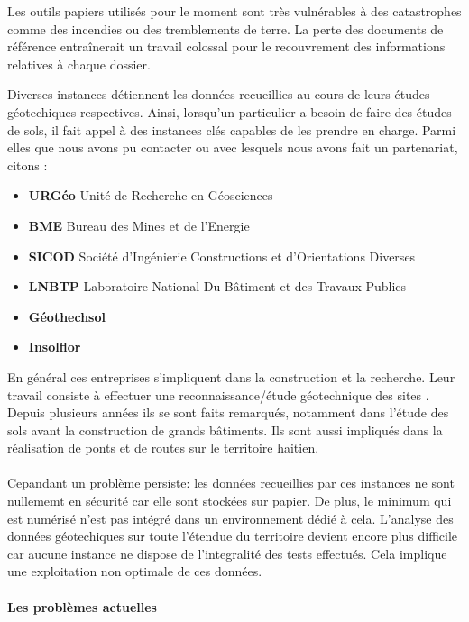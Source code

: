 \par
Les outils papiers utilisés pour le moment sont très vulnérables à des
catastrophes comme des incendies ou des tremblements de terre. La perte 
des documents de référence entraînerait un travail
colossal pour le recouvrement des informations relatives à chaque 
dossier.
\par
Diverses instances détiennent les données recueillies au cours
de leurs études géotechiques respectives. 
Ainsi, lorsqu’un particulier a besoin de faire des études de sols, il 
fait appel à des instances clés capables de les prendre en charge. 
Parmi elles que nous avons pu contacter ou avec lesquels nous avons fait un partenariat, citons :
\begin{itemize}
    \item \textbf{URGéo}
    Unité de Recherche en Géosciences 
    \item \textbf{BME}
    Bureau des Mines et de l’Energie
    \item \textbf{SICOD}
    Société d’Ingénierie Constructions et d’Orientations Diverses
    \item \textbf{LNBTP}
    Laboratoire National Du Bâtiment et des Travaux Publics 
    \item \textbf{Géothechsol}
    \item \textbf{Insolflor}
\end{itemize}   

\par
En général ces entreprises s'impliquent dans la construction et la recherche. 
Leur travail consiste à effectuer une reconnaissance/étude géotechnique des sites .
Depuis plusieurs années ils se sont faits remarqués, notamment dans
l'étude des sols avant la construction de grands bâtiments. Ils sont aussi impliqués
dans la réalisation de ponts et de routes sur le territoire
haitien. 
\paragraph{}
Cepandant un problème persiste: les données recueillies par ces instances
ne sont nullememt en sécurité car elle sont stockées sur papier.
De plus, le minimum qui est numérisé n'est pas intégré dans un environnement 
dédié à cela.
L'analyse des données géotechiques sur toute l'étendue du territoire devient
encore plus difficile car aucune instance ne dispose de l'integralité des tests effectués.
Cela implique une exploitation non optimale de ces données.
\paragraph{Les problèmes actuelles}
